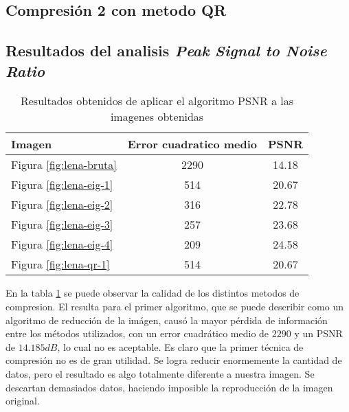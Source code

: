 \documentclass[twocolumn,a4paper,10pt]{article}
\begin{document}

\subsection{Compresi\'on 2 con metodo QR}


\subsection{Resultados del analisis \textit{Peak Signal to Noise Ratio}}

\begin{table}[H]
    \begin{tabular}{l|c|c}
        Imagen & Error cuadratico medio & PSNR \\
        \hline

        Figura \ref{fig:lena-bruta} & 2290 & 14.18 \\
        Figura \ref{fig:lena-eig-1} & 514  & 20.67 \\
        Figura \ref{fig:lena-eig-2} & 316  & 22.78 \\
        Figura \ref{fig:lena-eig-3} & 257  & 23.68 \\
        Figura \ref{fig:lena-eig-4} & 209  & 24.58 \\
        Figura \ref{fig:lena-qr-1}  & 514  & 20.67 \\

    \end{tabular}
    \caption{Resultados obtenidos de aplicar el algoritmo PSNR a las imagenes obtenidas}
    \label{tab:psnr}
\end{table}

En la tabla \ref{tab:psnr} se puede observar la calidad de los distintos metodos de compresion.
El resulta para el primer algoritmo, que se puede describir como un algoritmo de reducción de la imágen, causó la mayor pérdida de información entre los métodos utilizados, con un error cuadrático medio de $2290$ y un PSNR de $14.185 dB$, lo cual no es aceptable.
Es claro que la primer t\'ecnica de compresi\'on no es de gran utilidad. Se logra reducir enormemente la cantidad de datos, pero el resultado es algo
totalmente diferente a nuestra imagen. Se descartan demasiados datos, haciendo imposible la reproducci\'on de la imagen original.
\end{document}
